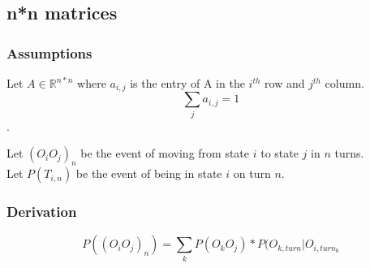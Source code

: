 \subsection{n*n matrices}
\subsubsection{Assumptions}
Let  $A \in \mathbb{R}^{n*n}$ where $a_{i,j}$ is the entry of A in the $i^{th}$ row and $j^{th}$ column.\\
$$\sum_{j} a_{i,j} = 1$$.

Let $(O_iO_j)_n$ be the event of moving from state $i$ to state $j$ in $n$ turns.\\
Let $P(T_{i,n})$ be the event of being in state $i$ on turn $n$.

\subsubsection{Derivation}
$$P((O_iO_j)_n) =  \sum_{k} P(O_kO_j)*P(O_{k,turn}|O_{i,turn_0}$$ 
